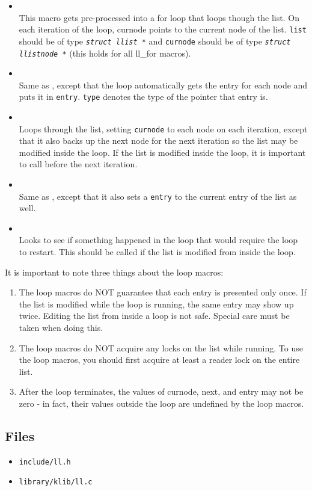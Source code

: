 \documentclass[a4paper]{article}
\begin{document}
\begin{itemize}
\item {} \\
This macro gets pre-processed into a for loop that loops though the list. On each iteration of the loop,
curnode points to the current node of the list. \texttt{list} should be of type \texttt{\textit{struct llist *}}
and \texttt{curnode} should be of type \texttt{\textit{struct llistnode *}} (this holds for all ll\_for macros).

\item {} \\
Same as , except that the loop automatically gets the entry
for each node and puts it in \texttt{entry}. \texttt{type} denotes the type of the
pointer that entry is.

\item {} \\
Loops through the list, setting \texttt{curnode} to each node on each iteration, except that it
also backs up the next node for the next iteration so the list may be modified inside the loop.
If the list is modified inside the loop, it is important to call  before
the next iteration.

\item {} \\
Same as , except that it also sets a \texttt{entry} to the
current entry of the list as well.

\item {} \\
Looks to see if something happened in the loop that would require the loop to restart. This should be
called if the list is modified from inside the loop.
\end{itemize}

It is important to note three things about the loop macros:
\begin{enumerate}
\item The loop macros do NOT guarantee that each entry is presented only once. If the list is modified
while the loop is running, the same entry may show up twice. Editing the list from inside a loop is not safe.
Special care must be taken when doing this.

\item The loop macros do NOT acquire any locks on the list while running. To use the loop macros, you should
first acquire at least a reader lock on the entire list.

\item After the loop terminates, the values of curnode, next, and entry may not be zero - in fact, 
their values outside the loop are undefined by the loop macros.
\end{enumerate}

\subsection{Files}
\begin{itemize}
\item \texttt{include/ll.h}
\item \texttt{library/klib/ll.c}
\end{itemize}
\end{document}
